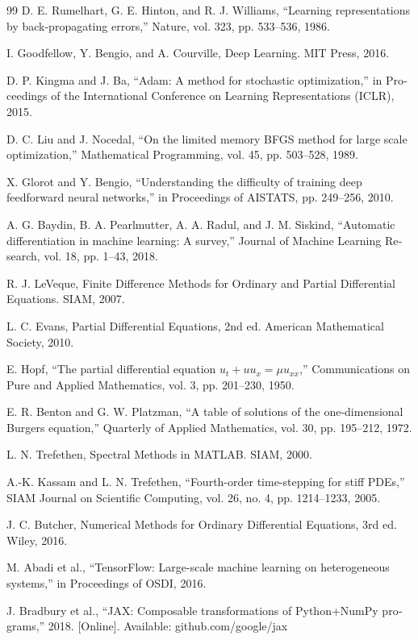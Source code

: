 \begin{singlespace}
\begin{latin}
\begin{thebibliography}{99}
D. E. Rumelhart, G. E. Hinton, and R. J. Williams, “Learning representations
by back-propagating errors,” Nature, vol. 323, pp. 533–536, 1986.

I. Goodfellow, Y. Bengio, and A. Courville, Deep Learning. MIT Press, 2016.

D. P. Kingma and J. Ba, “Adam: A method for stochastic optimization,” in
Proceedings of the International Conference on Learning Representations
(ICLR), 2015.

D. C. Liu and J. Nocedal, “On the limited memory BFGS method for large scale
optimization,” Mathematical Programming, vol. 45, pp. 503–528, 1989.

X. Glorot and Y. Bengio, “Understanding the difficulty of training deep
feedforward neural networks,” in Proceedings of AISTATS, pp. 249–256, 2010.

A. G. Baydin, B. A. Pearlmutter, A. A. Radul, and J. M. Siskind, “Automatic
differentiation in machine learning: A survey,” Journal of Machine Learning
Research, vol. 18, pp. 1–43, 2018.

R. J. LeVeque, Finite Difference Methods for Ordinary and Partial Differential
Equations. SIAM, 2007.

L. C. Evans, Partial Differential Equations, 2nd ed. American Mathematical
Society, 2010.

E. Hopf, “The partial differential equation $u_t+uu_x=\mu u_{xx}$,”
Communications on Pure and Applied Mathematics, vol. 3, pp. 201–230, 1950.

E. R. Benton and G. W. Platzman, “A table of solutions of the one-dimensional
Burgers equation,” Quarterly of Applied Mathematics, vol. 30, pp. 195–212,
1972.

L. N. Trefethen, Spectral Methods in MATLAB. SIAM, 2000.

A.-K. Kassam and L. N. Trefethen, “Fourth-order time-stepping for stiff PDEs,”
SIAM Journal on Scientific Computing, vol. 26, no. 4, pp. 1214–1233, 2005.

J. C. Butcher, Numerical Methods for Ordinary Differential Equations, 3rd ed.
Wiley, 2016.

M. Abadi et al., “TensorFlow: Large-scale machine learning on heterogeneous
systems,” in Proceedings of OSDI, 2016.

J. Bradbury et al., “JAX: Composable transformations of Python+NumPy
programs,” 2018. [Online]. Available: github.com/google/jax

\end{thebibliography}
\end{latin}
\end{singlespace}
